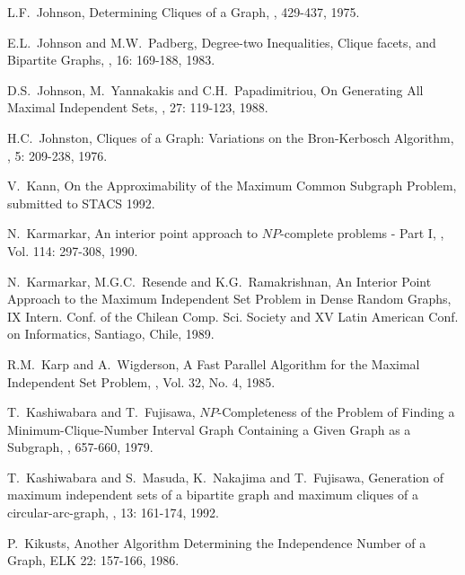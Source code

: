 \begin{thebibliography}{10}
L.F.~Johnson,
\newblock Determining Cliques of a Graph,
,
429-437, 1975.

E.L.~Johnson and M.W.~Padberg,
\newblock Degree-two Inequalities, Clique facets, and Bipartite
Graphs,
, 16: 169-188, 1983.

D.S.~Johnson, M.~Yannakakis and C.H.~Papadimitriou,
\newblock On Generating All Maximal Independent Sets,
, 27: 119-123, 1988.

H.C.~Johnston,
\newblock Cliques of a Graph: Variations on the Bron-Kerbosch
Algorithm,
, 5: 209-238,
1976.

V.~Kann,
\newblock On the Approximability of the Maximum Common Subgraph
Problem,
\newblock submitted to STACS 1992.

N.~Karmarkar,
\newblock An interior point approach to $NP$-complete problems -
Part I,
, Vol. 114: 297-308, 1990.

N.~Karmarkar, M.G.C.~Resende and K.G.~Ramakrishnan,
\newblock An Interior Point Approach to the Maximum Independent Set
Problem in Dense Random Graphs,
\newblock IX Intern. Conf. of the Chilean Comp. Sci. Society and XV
Latin American Conf. on Informatics, Santiago, Chile, 1989.

R.M.~Karp and A.~Wigderson,
\newblock A Fast Parallel Algorithm for the Maximal Independent Set
Problem,
, Vol. 32, No. 4, 1985.

T.~Kashiwabara and T.~Fujisawa,
\newblock $NP$-Completeness of the Problem of Finding a
Minimum-Clique-Number Interval Graph Containing a Given Graph as a
Subgraph,
, 657-660, 1979.

T.~Kashiwabara and S.~Masuda, K.~Nakajima and T.~Fujisawa,
\newblock Generation of maximum independent sets of a bipartite
graph and maximum cliques of a circular-arc-graph,
, 13: 161-174, 1992.

P.~Kikusts,
\newblock Another Algorithm Determining the Independence Number of a
Graph,
 ELK 22: 157-166, 1986.


\end{thebibliography}
